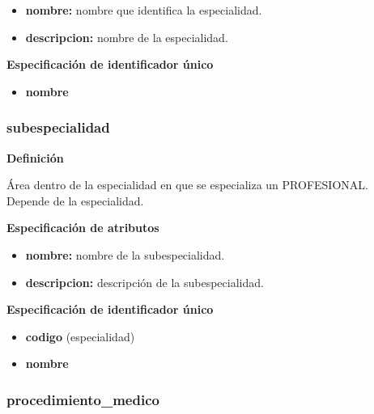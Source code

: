 \documentclass[a4paper,11pt]{article}
\begin{document}
\begin{itemize}

     \item \textbf{nombre:} nombre que identifica la especialidad.

     \item \textbf{descripcion:} nombre de la especialidad.

\end{itemize}

\textbf{Especificación de identificador único}

\begin{itemize}

     \item \textbf{nombre}

\end{itemize}

\subsubsection{\textbf{subespecialidad}}

\textbf{Definición}

Área dentro de la especialidad en que se especializa un PROFESIONAL. Depende de 
la especialidad.

\textbf{Especificación de atributos}

\begin{itemize}

     \item \textbf{nombre:} nombre de la subespecialidad.

     \item \textbf{descripcion:} descripción de la subespecialidad.

\end{itemize}

\textbf{Especificación de identificador único}

\begin{itemize}

     \item \textbf{codigo} (especialidad)

     \item \textbf{nombre}

\end{itemize}

\subsubsection{\textbf{procedimiento\_medico}}
\end{document}
